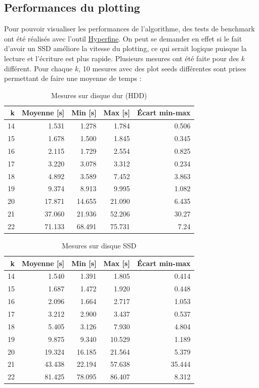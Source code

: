 \subsection{Performances du plotting}

Pour pouvoir visualiser les performances de l'algorithme, des tests de benchmark ont été réalisés avec l'outil \href{https://github.com/sharkdp/hyperfine}{Hyperfine}. On peut se demander en effet si le fait d'avoir un SSD améliore la vitesse du plotting, ce qui serait logique puisque la lecture et l'écriture est plus rapide. Plusieurs mesures ont été faite pour des $k$ différent. Pour chaque $k$, 10 mesures avec des plot seeds différentes sont prises permettant de faire une moyenne de temps :

\begin{table}[H]
  \centering
  \begin{tabular}{rrrrr}
    \textbf{k} & \textbf{Moyenne [s]} & \textbf{Min [s]} & \textbf{Max [s]} & \textbf{Écart min-max} \\
    \hline
    \hline
    14 & 1.531 & 1.278 & 1.784 & 0.506 \\
    \hline
    15 & 1.678 & 1.500   & 1.845 & 0.345 \\
    \hline
    16 & 2.115  & 1.729  & 2.554  & 0.825 \\
    \hline
    17 & 3.220   & 3.078  & 3.312  & 0.234 \\
    \hline
    18 & 4.892  & 3.589  & 7.452  & 3.863 \\
    \hline
    19 & 9.374  & 8.913  & 9.995  & 1.082 \\
    \hline
    20 & 17.871 & 14.655 & 21.090  & 6.435 \\
    \hline
    21 & 37.060  & 21.936 & 52.206 & 30.27 \\
    \hline
    22 & 71.133 & 68.491 & 75.731 & 7.24
  \end{tabular}
  \caption{Mesures sur disque dur (HDD)}
\end{table}

\begin{table}[H]
  \centering
  \begin{tabular}{rrrrr}
    \textbf{k} & \textbf{Moyenne [s]} & \textbf{Min [s]} & \textbf{Max [s]} & \textbf{Écart min-max} \\
    \hline
    \hline
    14 & 1.540  & 1.391  & 1.805  & 0.414  \\
    \hline
    15 & 1.687  & 1.472  & 1.920  & 0.448  \\
    \hline
    16 & 2.096  & 1.664  & 2.717  & 1.053  \\
    \hline
    17 & 3.212  & 2.900  & 3.437  & 0.537  \\
    \hline
    18 & 5.405  & 3.126  & 7.930  & 4.804  \\
    \hline
    19 & 9.875  & 9.340  & 10.529 & 1.189  \\
    \hline
    20 & 19.324 & 16.185 & 21.564 & 5.379  \\
    \hline
    21 & 43.438 & 22.194 & 57.638 & 35.444 \\
    \hline
    22 & 81.425 & 78.095 & 86.407 & 8.312
  \end{tabular}
  \caption{Mesures sur disque SSD}
\end{table}

